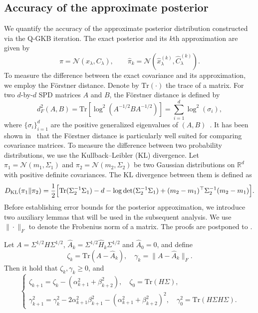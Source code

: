 \documentclass[]{myarticle}
\begin{document}
\subsection{Accuracy of the approximate posterior}\label{sec4.2}
We quantify the accuracy of the approximate posterior distribution constructed via the Q-GKB iteration. The exact posterior and its $k$th approximation are given by
\begin{equation}\label{eq:approx-post}
  \pi = \mathcal{N}(x_\lambda, C_\lambda), \qquad
  \widehat{\pi}_k = \mathcal{N}(\widehat{x}_\lambda^{(k)}, \widehat{C}_\lambda^{(k)}).
\end{equation}
To measure the difference between the exact covariance and its approximation, we employ the F{\"o}rstner distance. Denote by $\mathrm{Tr}(\cdot)$ the trace of a matrix. For two $d$-by-$d$ SPD matrices $A$ and $B$, the F{\"o}rstner distance is defined by
\begin{equation*}
  d_{F}^2(A,B) = \mathrm{Tr}\left[\log^2(A^{-1/2}BA^{-1/2})\right]
  = \sum_{i=1}^{d}\log^2(\sigma_i) ,
\end{equation*}
where $\{\sigma_i\}_{i=1}^{d}$ are the positive generalized eigenvalues of $(A,B)$~\cite{forstner2003metric}. It has been shown in~\cite{forstner2003metric,spantini2015optimal} that the F{\"o}rstner distance is particularly well suited for comparing covariance matrices. To measure the difference between two probability distributions, we use the Kullback--Leibler (KL) divergence. 
Let $\pi_1 = \mathcal N(m_1,\Sigma_1)$ and $\pi_2 = \mathcal N(m_2,\Sigma_2)$ be two Gaussian distributions on $\mathbb R^d$ with positive definite covariances. The KL divergence between them is defined as
\begin{align*}
  D_{\rm KL}(\pi_1\|\pi_2) 
  = \frac12 \Big[\mathrm{Tr}(\Sigma_2^{-1}\Sigma_1)-d-\log\det(\Sigma_2^{-1}\Sigma_1)
  +(m_2-m_1)^\top \Sigma_2^{-1}(m_2-m_1)\Big].
\end{align*}
Before establishing error bounds for the posterior approximation, we introduce two auxiliary lemmas that will be used in the subsequent analysis. We use $\|\cdot\|_{F}$ to denote the Frobenius norm of a matrix. The proofs are postponed to .

\begin{lemma}\label{lem:lanczos_decay}
  Let $A=\Sigma^{1/2}H\Sigma^{1/2}$, $\widehat{A}_k=\Sigma^{1/2}\widehat{H}_{k}\Sigma^{1/2}$ and $\widehat{A}_{0}=0$, and define 
  \begin{equation}
    \zeta_{k} = \mathrm{Tr}(A-\widehat{A}_k), \quad
    \gamma_{k} = \|A-\widehat{A}_k\|_{F} .
  \end{equation}
  Then it hold that $\zeta_k, \gamma_k\geq 0$, and
  \begin{equation}\label{zeta_gamma}
    \begin{cases}
      \zeta_{k+1} = \zeta_{k} - (\alpha_{k+1}^2+\beta_{k+2}^2), \quad \zeta_0=\mathrm{Tr}(H\Sigma), \\
      \gamma_{k+1}^2 = \gamma_{k}^2-2\alpha_{k+1}^2\beta_{k+1}^2-(\alpha_{k+1}^2+\beta_{k+2}^2)^2 , \quad \gamma_{0}^2=\mathrm{Tr}(H\Sigma H \Sigma).
    \end{cases}
  \end{equation}
\end{lemma}
\end{document}
